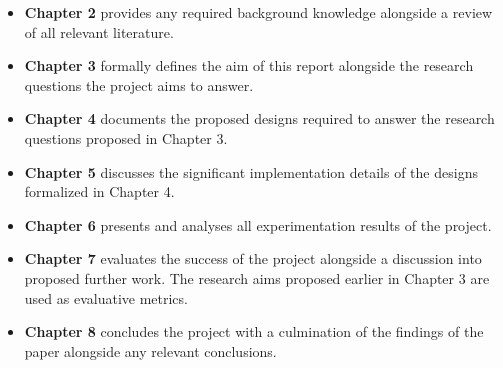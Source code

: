 \begin{itemize}
    \item \textbf{Chapter 2} provides any required background knowledge alongside a review of all relevant literature.

    \item \textbf{Chapter 3} formally defines the aim of this report alongside the research questions the project aims to answer.

    \item \textbf{Chapter 4} documents the proposed designs required to answer the research questions proposed in Chapter 3.

    \item \textbf{Chapter 5} discusses the significant implementation details of the designs formalized in Chapter 4.

    \item \textbf{Chapter 6} presents and analyses all experimentation results of the project.

    \item \textbf{Chapter 7} evaluates the success of the project alongside a discussion into proposed further work. The research aims proposed earlier in Chapter 3 are used as evaluative metrics.

    \item \textbf{Chapter 8} concludes the project with a culmination of the findings of the paper alongside any relevant conclusions.
    \end{itemize}
